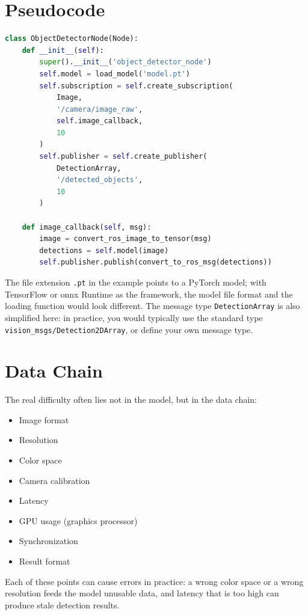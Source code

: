 \section{Pseudocode}
\begin{lstlisting}[language=Python]
class ObjectDetectorNode(Node):
    def __init__(self):
        super().__init__('object_detector_node')
        self.model = load_model('model.pt')
        self.subscription = self.create_subscription(
            Image,
            '/camera/image_raw',
            self.image_callback,
            10
        )
        self.publisher = self.create_publisher(
            DetectionArray,
            '/detected_objects',
            10
        )

    def image_callback(self, msg):
        image = convert_ros_image_to_tensor(msg)
        detections = self.model(image)
        self.publisher.publish(convert_to_ros_msg(detections))
\end{lstlisting}

The file extension \texttt{.pt} in the example points to a PyTorch model; with TensorFlow or \gls{onnx} Runtime as the framework, the model file format and the loading function would look different. The message type \texttt{DetectionArray} is also simplified here: in practice, you would typically use the standard type \texttt{vision\_msgs/Detection2DArray}, or define your own message type.

\section{Data Chain}
The real difficulty often lies not in the model, but in the data chain:

\begin{itemize}
    \item Image format
    \item Resolution
    \item Color space
    \item Camera calibration
    \item Latency
    \item GPU usage (graphics processor)
    \item Synchronization
    \item Result format
\end{itemize}

Each of these points can cause errors in practice: a wrong color space or a wrong resolution feeds the model unusable data, and latency that is too high can produce stale detection results.

